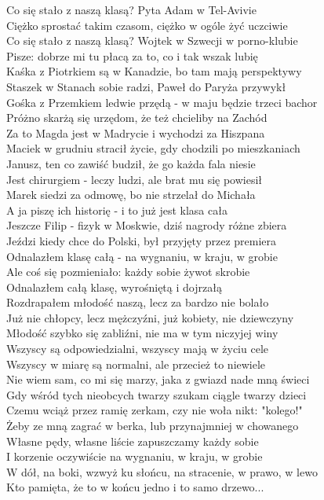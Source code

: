 
Co się stało z naszą klasą? Pyta Adam w Tel-Avivie \\
Ciężko sprostać takim czasom, ciężko w ogóle żyć uczciwie \\
Co się stało z naszą klasą? Wojtek w Szwecji w porno-klubie \\
Pisze: dobrze mi tu płacą za to, co i tak wszak lubię \\
\hops
Kaśka z Piotrkiem są w Kanadzie, bo tam mają perspektywy \\
Staszek w Stanach sobie radzi, Paweł do Paryża przywykł \\
Gośka z Przemkiem ledwie przędą - w maju będzie trzeci bachor \\
Próżno skarżą się urzędom, że też chcieliby na Zachód \\
\hops
Za to Magda jest w Madrycie i wychodzi za Hiszpana \\
Maciek w grudniu stracił życie, gdy chodzili po mieszkaniach \\
Janusz, ten co zawiść budził, że go każda fala niesie \\
Jest chirurgiem - leczy ludzi, ale brat mu się powiesił \\
\hops
Marek siedzi za odmowę, bo nie strzelał do Michała \\
A ja piszę ich historię - i to już jest klasa cała \\
Jeszcze Filip - fizyk w Moskwie, dziś nagrody różne zbiera \\
Jeździ kiedy chce do Polski, był przyjęty przez premiera \\
\hops
Odnalazłem klasę całą - na wygnaniu, w kraju, w grobie \\
Ale coś się pozmieniało: każdy sobie żywot skrobie \\
Odnalazłem całą klasę, wyrośniętą i dojrzałą \\
Rozdrapałem młodość naszą, lecz za bardzo nie bolało \\
\hops
Już nie chłopcy, lecz mężczyźni, już kobiety, nie dziewczyny \\
Młodość szybko się zabliźni, nie ma w tym niczyjej winy \\
Wszyscy są odpowiedzialni, wszyscy mają w życiu cele \\
Wszyscy w miarę są normalni, ale przecież to niewiele \\
\hops
Nie wiem sam, co mi się marzy, jaka z gwiazd nade mną świeci \\
Gdy wśród tych nieobcych twarzy szukam ciągle twarzy dzieci \\
Czemu wciąż przez ramię zerkam, czy nie woła nikt: "kolego!" \\
Żeby ze mną zagrać w berka, lub przynajmniej w chowanego \\
\hops
Własne pędy, własne liście zapuszczamy każdy sobie \\
I korzenie oczywiście na wygnaniu, w kraju, w grobie \\
W dół, na boki, wzwyż ku słońcu, na stracenie, w prawo, w lewo \\
Kto pamięta, że to w końcu jedno i to samo drzewo... 